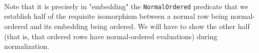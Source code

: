 \documentclass[authoryear, acmsmall, screen, review, nonacm]{acmart}
\begin{document}
\begin{code}%
\>[0]\AgdaSpace{}%
\AgdaSymbol{:}\AgdaSpace{}%
\AgdaSpace{}%
\AgdaSpace{}%
\AgdaSpace{}%
\AgdaSpace{}%
\AgdaSpace{}%
\AgdaSpace{}%
\<%
\\
\>[0]\AgdaSpace{}%
\AgdaSymbol{:}\AgdaSpace{}%
\AgdaSpace{}%
\AgdaSpace{}%
\AgdaSpace{}%
\AgdaOperator{\AgdaInductiveConstructor{R[}}\AgdaSpace{}%
\AgdaSpace{}%
\AgdaOperator{\AgdaInductiveConstructor{]}}\AgdaSpace{}%
\AgdaSpace{}%
\AgdaSpace{}%
\AgdaSpace{}%
\AgdaSpace{}%
\AgdaOperator{\AgdaInductiveConstructor{R[}}\AgdaSpace{}%
\AgdaSpace{}%
\AgdaOperator{\AgdaInductiveConstructor{]}}\<%
\\
\>[0]\AgdaSpace{}%
\AgdaSymbol{:}\AgdaSpace{}%
\AgdaSpace{}%
\AgdaSpace{}%
\AgdaSpace{}%
\AgdaSpace{}%
\AgdaSpace{}%
\AgdaSpace{}%
\<%
\\
\>[0]\AgdaSpace{}%
\AgdaSymbol{:}\AgdaSpace{}%
\AgdaSpace{}%
\AgdaSpace{}%
\AgdaOperator{\AgdaInductiveConstructor{R[}}\AgdaSpace{}%
\AgdaSpace{}%
\AgdaOperator{\AgdaInductiveConstructor{]}}\AgdaSpace{}%
\AgdaSpace{}%
\AgdaSpace{}%
\AgdaSpace{}%
\AgdaSpace{}%
\AgdaOperator{\AgdaInductiveConstructor{R[}}\AgdaSpace{}%
\AgdaSpace{}%
\AgdaOperator{\AgdaInductiveConstructor{]}}\<%
\end{code}

Note that it is precisely in "embedding" the \verb!NormalOrdered! predicate that we establish half of the requisite isomorphism between a normal row being normal-ordered and its embedding being ordered. We will have to show the other half (that is, that ordered rows have normal-ordered evaluations) during normalization.

\begin{code}%
\>[0]\AgdaSpace{}%
\AgdaSymbol{:}\AgdaSpace{}%
%
\>[4297I]\AgdaSymbol{(}\AgdaSpace{}%
\AgdaSymbol{:}\AgdaSpace{}%
\AgdaSpace{}%
\AgdaSpace{}%
\AgdaSpace{}%
\AgdaOperator{\AgdaInductiveConstructor{R[}}\AgdaSpace{}%
\AgdaSpace{}%
\AgdaOperator{\AgdaInductiveConstructor{]}}\AgdaSymbol{)}\AgdaSpace{}%
\AgdaSpace{}%
\AgdaSpace{}%
\AgdaSpace{}%
\<%
\\
\>[.][@{}l@{}]\<[4297I]%
\>[13]\AgdaSpace{}%
\AgdaSymbol{(}\AgdaSpace{}%
\AgdaSymbol{)}\<%
\end{code}
\end{document}
